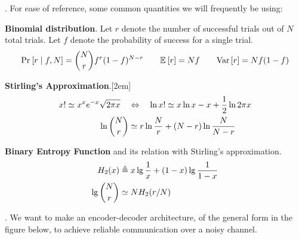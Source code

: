 \documentclass[11pt]{article}
\begin{document}
\p {}. For ease of reference, some common quantities we will frequently be using: 
\begin{compactitem}
	\item \textbf{Binomial distribution}. Let $r$ denote the number of successful trials out of $N$ total trials. Let $f$ denote the probability of success for a single trial.
	\begin{align}
	\text{Pr}_{}\left[r \mid f, N\right] = \binom{N}{r} f^r (1 - f)^{N - r} \qquad
	\mathbb{E}_{}\left[r\right] = Nf \qquad
	\mathrm{Var}\left[r\right] = Nf(1-f)
	\end{align}
	
	\item \textbf{Stirling's Approximation}.[2em]
	\begin{align}
	x! \simeq x^x e^{-x} \sqrt{2 \pi x} 
	\quad &\Leftrightarrow \quad
	\ln x! \simeq x \ln x - x + \frac{1}{2} \ln 2 \pi x \\
	\ln\binom{N}{r} &\simeq r \ln \frac{N}{r} + (N - r) \ln \frac{N}{N - r}
	\end{align}
	
	\item \textbf{Binary Entropy Function} and its relation with Stirling's approximation.
	\begin{align}
	H_2(x) &\triangleq x \lg \frac{1}{x} + (1-x) \lg \frac{1}{1 - x} \\
	\lg \binom{N}{r} &\simeq N H_2(r/N)
	\end{align}
\end{compactitem}

. We want to make an encoder-decoder architecture, of the general form in the figure below, to achieve reliable communication over a noisy channel.
\end{document}
